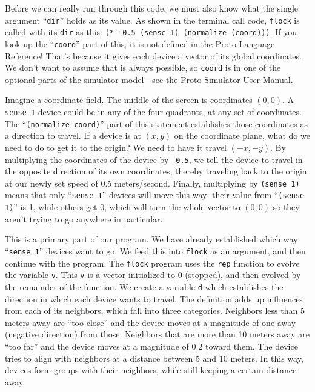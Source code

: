 \documentclass{article}
\newcommand\var[1]{{\tt #1}}
\newcommand\qvar[1]{``{\tt #1}''}
\begin{document}
Before we can really run through this code, we must also know what the
single argument \qvar{dir} holds as its value.  As shown in the
terminal call code, \var{flock} is called with its \var{dir} as this:
\var{(* -0.5 (sense 1) (normalize (coord)))}.  If you look up the
\qvar{coord} part of this, it is not defined in the Proto Language
Reference!  That's because it gives each device a vector of its global
coordinates.  We don't want to assume that is always possible, so
\var{coord} is in one of the optional parts of the simulator
model---see the Proto Simulator User Manual.

Imagine a coordinate field.  The middle of the screen is coordinates
$(0, 0)$. A \var{sense 1} device could be in any of the four
quadrants, at any set of coordinates.  The \qvar{(normalize coord)}
part of this statement establishes those coordinates as a direction to
travel.  If a device is at $(x, y)$ on the coordinate plane, what do
we need to do to get it to the origin?  We need to have it travel
$(-x, -y)$.  By multiplying the coordinates of the device by
\var{-0.5}, we tell the device to travel in the opposite direction of
its own coordinates, thereby traveling back to the origin at our newly
set speed of 0.5 meters/second.  Finally, multiplying by \var{(sense
  1)} means that only \qvar{sense 1} devices will move this way: their
value from \qvar{(sense 1)} is 1, while others get 0, which will turn
the whole vector to $(0, 0)$ so they aren't trying to go anywhere in
particular.

This is a primary part of our program.  We have already established
which way \qvar{sense 1} devices want to go.  We feed this into
\var{flock} as an argument, and then continue with the program.  The
\var{flock} program uses the \var{rep} function to evolve the variable
\var{v}. This \var{v} is a vector initialized to 0 (stopped), and then
evolved by the remainder of the function.  We create a variable
\var{d} which establishes the direction in which each device wants to
travel.  The definition adds up influences from each of its neighbors,
which fall into three categories.  Neighbors less than 5 meters away
are ``too close'' and the device moves at a magnitude of one away
(negative direction) from those.  Neighbors that are more than 10
meters away are ``too far'' and the device moves at a magnitude of 0.2
toward them.  The device tries to align with neighbors at a distance
between 5 and 10 meters.  In this way, devices form groups with their
neighbors, while still keeping a certain distance away.
\end{document}

